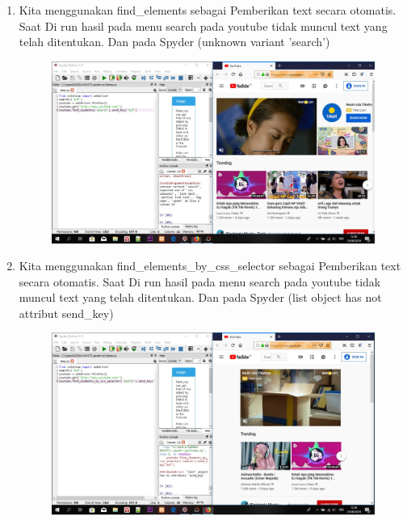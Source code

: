 \begin{enumerate}
    \item Kita menggunakan find\_elements sebagai Pemberikan text secara otomatis. Saat  Di run hasil pada menu search pada youtube tidak muncul text yang telah ditentukan. Dan pada Spyder {(unknown variant 'search')}
\begin{figure}[!htbp]
    \centering
    \includegraphics[scale=0.3]{figure/hasilTes/9.jpg}
    \label{gambar 1}
\end{figure}

    \item Kita menggunakan find\_elements\_by\_css\_selector sebagai Pemberikan text secara otomatis. Saat  Di run hasil pada menu search pada youtube tidak muncul text yang telah ditentukan. Dan pada Spyder {(list object has not attribut send\_key)}
\begin{figure}[!htbp]
    \centering
    \includegraphics[scale=0.3]{figure/hasilTes/10.jpeg}
    \label{gambar 1}
\end{figure}


\end{enumerate}
